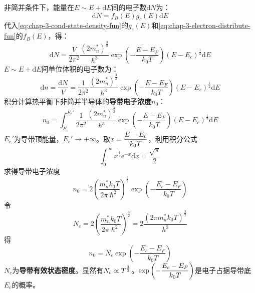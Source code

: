 非简并条件下，能量在$E\sim E+\mathrm{d}E$间的电子数$\mathrm{d}N$为：
\begin{equation}
    \mathrm{d}N=f_B(E)g_c(E)\mathrm{d}E
\end{equation}
代入\autoref{eq:chap-3-cond-state-density-fun}的$g_c(E)$和\autoref{eq:chap-3-electron-distribute-fun}的$f_B(E)$，得：
\begin{equation}
    \mathrm{d}N=\frac{V}{2\pi^2}\frac{\left(2m_n^*\right)^{\frac{3}{2}}}{\hslash^3}\exp{\left(-\frac{E-E_F}{k_0T}\right)}\left(E-E_c\right)^{\frac{1}{2}}\mathrm{d}E
\end{equation}
$E\sim E+\mathrm{d}E$间单位体积的电子数为：
\begin{equation}
    \mathrm{d}n=\frac{\mathrm{d}N}{V}=\frac{1}{2\pi^2}\frac{\left(2m_n^*\right)^{\frac{3}{2}}}{\hslash^3}\exp{\left(-\frac{E-E_F}{k_0T}\right)}\left(E-E_c\right)^{\frac{1}{2}}\mathrm{d}E\label{eq:chap-3-electron-number-in-dE-unit-volume}
\end{equation}
积分计算热平衡下非简并半导体的\textbf{导带电子浓度}$n_0$：
\begin{equation}
    n_0=\int_{E_c}^{E_c'}\frac{1}{2\pi^2}\frac{\left(2m_n^*\right)^{\frac{3}{2}}}{\hslash^3}\exp{\left(-\frac{E-E_F}{k_0T}\right)}\left(E-E_c\right)^{\frac{1}{2}}\mathrm{d}E
\end{equation}
\vspace{1ex}$E_c'$为导带顶能量，$E_c'\rightarrow +\infty$。取$\displaystyle x=\frac{E-E_c}{k_0T}$，利用积分公式
\begin{equation}
    \int_0^\infty x^\frac{1}{2}\mathrm{e}^{-x}\mathrm{d}x=\frac{\sqrt{\pi}}{2}
\end{equation}
求得导带电子浓度
\begin{equation}
    n_0=2\left(\frac{m_n^*k_0T}{2\pi\hslash^2}\right)^\frac{3}{2}\exp{\left(-\frac{E_c-E_F}{k_0T}\right)}
\end{equation}
令
\begin{equation}
    N_c=2\left(\frac{m_n^*k_0T}{2\pi\hslash^2}\right)^\frac{3}{2}=2\frac{\left(2\pi m_n^*k_0T\right)^\frac{3}{2}}{h^{3}}
\end{equation}
得
\begin{equation}
    n_0=N_c\exp{\left(-\frac{E_c-E_F}{k_0T}\right)}\label{eq:chap-3-cond-electron-concentration}
\end{equation}
\vspace{1ex}$N_c$为\textbf{导带有效状态密度}。显然有$N_c\propto\displaystyle T^\frac{3}{2}$。$\displaystyle \exp{\left(-\frac{E_c-E_F}{k_0T}\right)}$是电子占据导带底$E_c$的概率。


